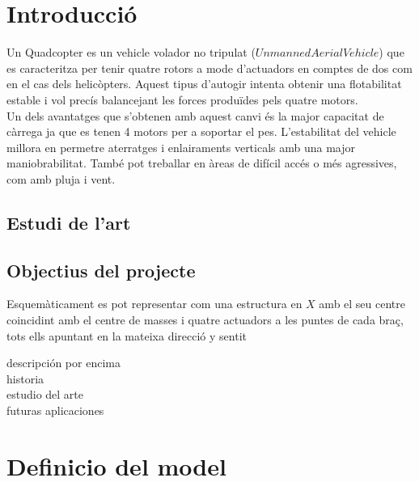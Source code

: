 \documentclass[twoside]{article}
\begin{document}
\section{Introducció}
Un Quadcopter es un vehicle volador no tripulat ($Unmanned Aerial Vehicle$) que es caracteritza per tenir quatre rotors a mode d'actuadors en comptes de dos com en el cas dels helicòpters. Aquest tipus d'autogir intenta obtenir una flotabilitat estable i vol precís balancejant les forces produïdes pels quatre motors. \\

Un dels avantatges que s'obtenen amb aquest canvi és la major capacitat de càrrega ja que es tenen 4 motors  per a soportar el pes. L'estabilitat del vehicle millora en permetre aterratges i enlairaments verticals amb una major maniobrabilitat. També pot treballar en àreas de difícil accés o més agressives, com amb pluja i vent. \\



\subsection{Estudi de l'art}
\subsection{Objectius del projecte}
Esquemàticament es pot representar com una estructura en $X$ amb el seu centre coincidint amb el centre de masses i quatre actuadors a les puntes de cada braç, tots ells apuntant en la mateixa direcció y sentit

descripción por encima\\
historia\\
estudio del arte\\
futuras aplicaciones\\

\newpage
\section{Definicio del model}
\end{document}
